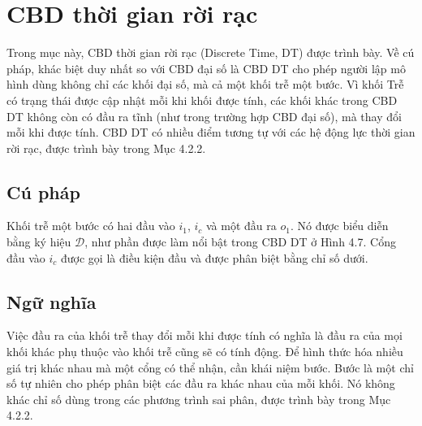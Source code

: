 \section{CBD thời gian rời rạc}
Trong mục này, CBD thời gian rời rạc (Discrete Time, DT) được trình bày. Về cú pháp, khác biệt duy nhất so với CBD đại số là CBD DT cho phép người lập mô hình dùng không chỉ các khối đại số, mà cả một khối trễ một bước. Vì khối Trễ có trạng thái được cập nhật mỗi khi khối được tính, các khối khác trong CBD DT không còn có đầu ra tĩnh (như trong trường hợp CBD đại số), mà thay đổi mỗi khi được tính. CBD DT có nhiều điểm tương tự với các hệ động lực thời gian rời rạc, được trình bày trong Mục 4.2.2.

\subsection{Cú pháp}
Khối trễ một bước có hai đầu vào $i_1$, $i_c$ và một đầu ra $o_1$. Nó được biểu diễn bằng ký hiệu $\mathcal D$, như phần được làm nổi bật trong CBD DT ở Hình 4.7. Cổng đầu vào $i_c$ được gọi là điều kiện đầu và được phân biệt bằng chỉ số dưới.

\subsection{Ngữ nghĩa}
Việc đầu ra của khối trễ thay đổi mỗi khi được tính có nghĩa là đầu ra của mọi khối khác phụ thuộc vào khối trễ cũng sẽ có tính động. Để hình thức hóa nhiều giá trị khác nhau mà một cổng có thể nhận, cần khái niệm bước. Bước là một chỉ số tự nhiên cho phép phân biệt các đầu ra khác nhau của mỗi khối. Nó không khác chỉ số dùng trong các phương trình sai phân, được trình bày trong Mục 4.2.2.

